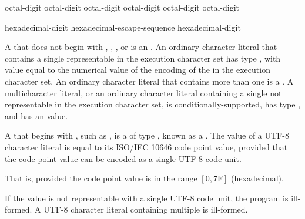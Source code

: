 \begin{bnf}
\br
    \terminal{\textbackslash} octal-digit\br
    \terminal{\textbackslash} octal-digit octal-digit\br
    \terminal{\textbackslash} octal-digit octal-digit octal-digit
\end{bnf}

\begin{bnf}
\br
     hexadecimal-digit\br
    hexadecimal-escape-sequence hexadecimal-digit
\end{bnf}

\pnum
{}%
%
%
%
%
A  that does not begin with
, , , or 
is an .
An ordinary character literal that contains a
single  representable in the execution character
set has type , with value equal to the
numerical value of the encoding of the  in the
execution character set. An ordinary character literal that contains
more than one  is a
%
.
A multicharacter literal, or an ordinary character literal containing
a single  not representable in the execution
character set, is conditionally-supported, has type ,
%
and has an  value.

\pnum
{}%
A  that
begins with , such as ,
%
is a  of type ,
known as a .
The value of a UTF-8 character literal
is equal to its ISO/IEC 10646 code point value,
provided that the code point value
can be encoded as a single UTF-8 code unit.
\begin{note}
That is, provided the code point value is in the range $[0, \mathrm{7F}]$ (hexadecimal).
\end{note}
If the value is not representable with a single UTF-8 code unit,
the program is ill-formed.
A UTF-8 character literal containing multiple  is ill-formed.

